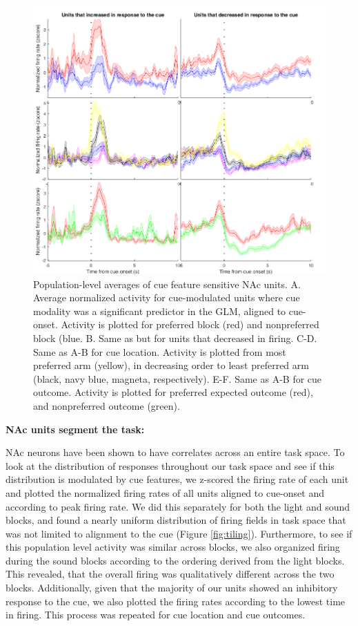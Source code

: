 \documentclass[11pt]{article}
\begin{document}
\begin{figure}[h]
\centering
\includegraphics[width=\textwidth]{Fig 7 - Population averages.png}
\caption{Population-level averages of cue feature sensitive NAc units. A. Average normalized activity for cue-modulated units where cue modality was a significant predictor in the GLM, aligned to cue-onset. Activity is plotted for preferred block (red) and nonpreferred block (blue. B. Same as but for units that decreased in firing. C-D. Same as A-B for cue location. Activity is plotted from most preferred arm (yellow), in decreasing order to least preferred arm (black, navy blue, magneta, respectively). E-F. Same as A-B for cue outcome. Activity is plotted for preferred expected outcome (red), and nonpreferred outcome (green).}
\label{fig:pop}
\end{figure}

{\bf NAc units segment the task:}

NAc neurons have been shown to have correlates across an entire task space. To look at the distribution of responses throughout our task space and see if this distribution is modulated by cue features, we z-scored the firing rate of each unit and plotted the normalized firing rates of all units aligned to cue-onset and according to peak firing rate. We did this separately for both the light and sound blocks, and found a nearly uniform distribution of firing fields in task space that was not limited to alignment to the cue (Figure \ref{fig:tiling}). Furthermore, to see if this population level activity was similar across blocks, we also organized firing during the sound blocks according to the ordering derived from the light blocks. This revealed, that the overall firing was qualitatively different across the two blocks. Additionally, given that the majority of our units showed an inhibitory response to the cue, we also plotted the firing rates according to the lowest time in firing. This process was repeated for cue location and cue outcomes. 
\end{document}
